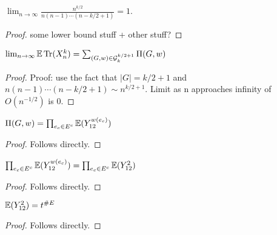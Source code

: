 \begin{proposition}
  \label{lemma:fraction_limit_one}
  \notready
  $\lim_{n\to\infty}\frac{n^{k/2}}{n(n-1)\cdots(n-k/2+1)} = 1$.
\end{proposition}

\begin{proof}
  \notready
  some lower bound stuff + other stuff?
\end{proof}


\begin{proposition}
  \label{prop:trace_ev_limit_equals_sum}
  \notready
  $\lim_{n\to\infty}\mathbb{E}\operatorname{Tr}(X_n^k) = \sum_{(G,w)\in\mathcal{G}^{k/2+1}_k} \Pi(G,w)$
\end{proposition}

\begin{proof}
  \notready
  Proof: use the fact that $|G|=k/2+1$ and $n(n-1)\cdots(n-k/2+1) \sim n^{k/2+1}$. Limit as n approaches infinity of $O(n^{-1/2})$ is 0.
\end{proof}


\begin{lemma}
  \label{lemma:prod_expansion}
  \notready
  $\Pi(G,w) = \prod_{e_c\in E^c} \mathbb{E}(Y_{12}^{w(e_c)})$
\end{lemma}

\begin{proof}
  \notready
  Follows directly.
\end{proof}

\begin{lemma}
  \label{lemma:w_2_case}
  \notready
  $\prod_{e_c\in E^c} \mathbb{E}(Y_{12}^{w(e_c)}) = \prod_{e_c\in E^c} \mathbb{E}(Y_{12}^2)$
\end{lemma}

\begin{proof}
  \notready
  Follows directly.
\end{proof}

\begin{lemma}
  \label{lemma:def_t_rewrite}
  \notready
  $\mathbb{E}(Y_{12}^2) = t^{\#E}$
\end{lemma}

\begin{proof}
  \notready
  Follows directly.
\end{proof}

